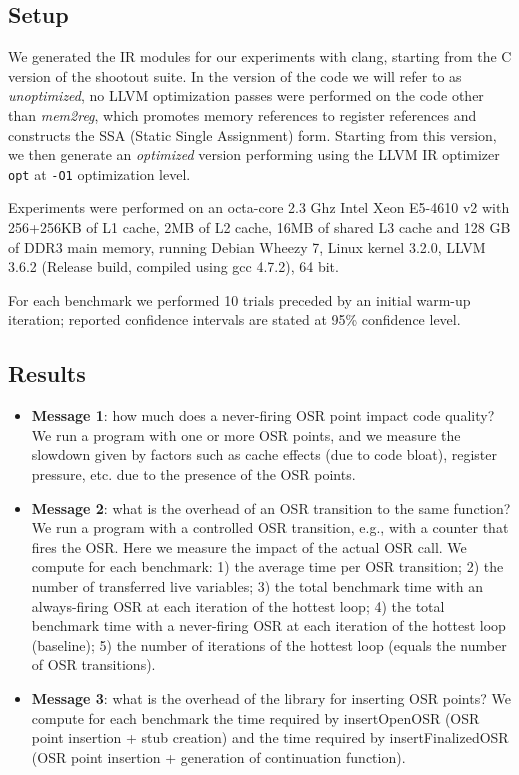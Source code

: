 \subsection{Setup}

We generated the IR modules for our experiments with clang, starting from the C version of the shootout suite. In the version of the code we will refer to as {\em unoptimized}, no LLVM optimization passes were performed on the code other than {\em mem2reg}, which promotes memory references to register references and constructs the SSA (Static Single Assignment) form. Starting from this version, we then generate an {\em optimized} version performing using the LLVM IR optimizer {\tt opt} at {\tt -O1} optimization level.

Experiments were performed on an octa-core 2.3 Ghz Intel Xeon E5-4610 v2 with 256+256KB of L1 cache, 2MB of L2 cache, 16MB of shared L3 cache and 128 GB of DDR3 main memory, running Debian Wheezy 7, Linux kernel 3.2.0, LLVM 3.6.2 (Release build, compiled using gcc 4.7.2), 64 bit.

For each benchmark we performed 10 trials preceded by an initial warm-up iteration; reported confidence intervals are stated at 95\% confidence level.

\subsection{Results}

\begin{itemize}
\item {\bf Message 1}: how much does a never-firing OSR point impact code quality? We run a program with one or more OSR points, and we measure the slowdown given by factors such as cache effects (due to code bloat), register pressure, etc. due to the presence of the OSR points.
\item {\bf Message 2}: what is the overhead of an OSR transition to the same function? We run a program with a controlled OSR transition, e.g., with a counter that fires the OSR. Here we measure the impact of the actual OSR call. We compute for each benchmark: 1) the average time per OSR transition; 2) the number of transferred live variables; 3) the total benchmark time with an always-firing OSR at each iteration of the hottest loop; 4) the total benchmark time with a never-firing OSR at each iteration of the hottest loop (baseline); 5) the number of iterations of the hottest loop (equals the number of OSR transitions).
\item {\bf Message 3}: what is the overhead of the library for inserting OSR points? We compute for each benchmark the time required by insertOpenOSR (OSR point insertion + stub creation) and the time required by insertFinalizedOSR (OSR point insertion + generation of continuation function).
\end{itemize}

